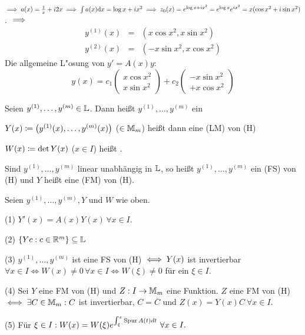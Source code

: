\documentclass[a4paper,twoside,DIV15,BCOR12mm]{scrbook}
\begin{document}
\begin{beispiele}
$\implies a(x)=\frac{1}{x}+i2x\implies\int a(x)\text{d}x=\log x+ix^2 \implies z_0(x)=e^{\log x + ix^2}=e^{\log x}e^{ix^2}=x(\cos x^2 + i\sin x^2)$.
$\implies$
\begin{eqnarray*}
	y^{(1)}(x)&=&(x\cos x^2, x\sin x^2)\\
	y^{(2)}(x)&=&(-x\sin x^2, x\cos x^2)
\end{eqnarray*}
Die allgemeine L"osung von $y'=A(x)y: $
\[
	y(x)=c_1\begin{pmatrix}x\cos x^2\\ x\sin x^2\end{pmatrix}+c_2\begin{pmatrix}-x\sin x^2\\ +x\cos x^2\end{pmatrix}
\]
\end{beispiele}



\begin{definition}
\begin{liste}
\item Seien $y^{(1)},\dots,y^{(m)} \in \mathbb{L}$. Dann heißt $y^{(1)},\dots,y^{(m)}$ ein 
\item $Y(x)\mathrel{\mbox{$\coloneqq$}} \left(y^{(1)}(x),\ldots,y^{(m)}(x)\right)$ ($\in \mathbb{M}_m$) heißt dann eine  (LM) von (H)
\item $W(x) \mathrel{\mbox{$\coloneqq$}}  \det Y(x)$ ($x\in I$) heißt .
\item Sind $y^{(1)},\dots,y^{(m)}$ linear unabhängig in $\mathbb{L}$, so hei\ss t $y^{(1)},\dots,y^{(m)}$ ein  (FS) von (H) und $Y$ hei\ss t eine  (FM) von (H).

\end{liste}
\end{definition}

\begin{satz} %
Seien $y^{(1)},\dots,y^{(m)}, Y$ und $W$ wie oben.
\begin{liste}
\item[(1)] $Y'(x) = A(x)Y(x) \, \forall x \in I.$
\item[(2)] $\{ Yc:c\in \mathbb{R}^m \} \subseteq \mathbb{L}$
\item[(3)] $y^{(1)},\dots,y^{(m)}$ ist eine FS von (H) $\iff Y(x)$ ist invertierbar $\forall x \in I \Leftrightarrow W(x) \not= 0 \, \forall x \in I \Leftrightarrow W(\xi) \not= 0$ für ein $\xi \in I$.
\item[(4)] Sei $Y$ eine FM von (H) und $Z: I \rightarrow \mathbb{M}_m$ eine Funktion. $Z$ eine FM von (H) $\iff \exists C \in \mathbb{M}_m: C$ ist invertierbar, $C = \overline{C}$ und $Z(x)=Y(x)C \ \forall x \in I.$
\item[(5)] Für $\xi \in I: W(x) = W(\xi)e^{\int_{\xi}^{x} \mathop{\mathrm{Spur}}\nolimits A(t)dt} \ \forall x \in I.$
\end{liste}
\end{satz}
\end{document}
